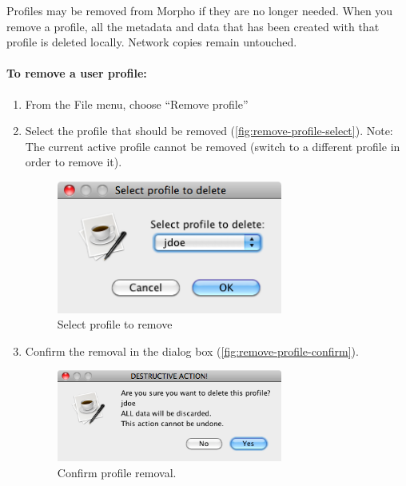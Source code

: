 Profiles may be removed from Morpho if they are no longer needed.
When you remove a profile, all the metadata and data that has been created 
with that profile is deleted locally. Network copies remain untouched.

\paragraph{To remove a user profile:}
\begin{enumerate}
  \item From the File menu, choose ``Remove profile''
  \item Select the profile that should be removed (\autoref{fig:remove-profile-select}).
  Note: The current active profile cannot be removed (switch to a different profile in order to remove it).
  
  
  \begin{figure}
  \centering
    \includegraphics[width=0.7\textwidth]{images/remove-profile-select.png}
  \caption{Select profile to remove}
  \label{fig:remove-profile-select}
\end{figure}
  
  \item Confirm the removal in the dialog box (\autoref{fig:remove-profile-confirm}).
  \begin{figure}
  \centering
    \includegraphics[width=0.7\textwidth]{images/remove-profile-confirm.png}
  \caption{Confirm profile removal.}
  \label{fig:remove-profile-confirm}
\end{figure}

\end{enumerate}

